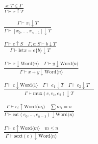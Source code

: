 \documentclass{article}
\newcommand{\judgment}[2]{\ensuremath{#1 \vdash #2}}
\newcommand{\word}[1]{\text{Word}\langle #1 \rangle}
\begin{document}
\begin{align*}
    \frac{
        x : T \in \Gamma
    }{
        \judgment{\Gamma}{x \uparrow T}
    } \\
    \\
    \frac{
        \judgment{\Gamma}{x_i \downarrow T}
    }{
        \judgment{\Gamma}{[x_0, \dots, x_{n-1}]  \downarrow T}
    } \\
    \\
    \frac{
        \judgment{\Gamma}{e \uparrow S} \quad
        \judgment{\Gamma, e : S}{b \downarrow T}
    }{
        \judgment{\Gamma}{\text{let} x = e \{ b \} \downarrow T}
    } \\
    \\
    \frac{
        \judgment{\Gamma}{x \downarrow \word{n}} \quad
        \judgment{\Gamma}{y \downarrow \word{n}}
    }{
        \judgment{\Gamma}{x + y \downarrow \word{n}}
    } \\
    \\
    \frac{
        \judgment{\Gamma}{c \downarrow \word{1}} \quad
        \judgment{\Gamma}{e_1 \downarrow T}\quad
        \judgment{\Gamma}{e_2 \downarrow T}\quad
    }{
        \judgment{\Gamma}{\text{mux}(c, e_1, e_2) \downarrow T}
    } \\
    \\
    \frac{
        \judgment{\Gamma}{e_i \uparrow \word{m_i}} \quad
        \sum{m_i} = n
    }{
        \judgment{\Gamma}{\text{cat}(e_0, \dots, e_{n-1}) \downarrow \word{n}}
    } \\
    \\
    \frac{
        \judgment{\Gamma}{e \uparrow \word{m}} \quad
        m \le n
    }{
        \judgment{\Gamma}{\text{sext}(e) \downarrow \word{n}}
    } \\
\end{align*}
\end{document}
